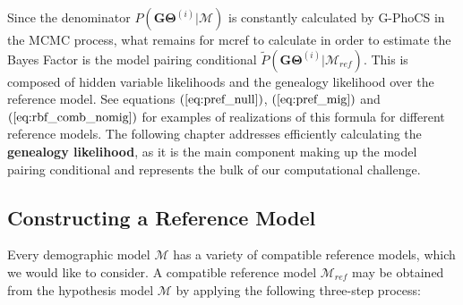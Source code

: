 \documentclass[11pt]{article}
\newcommand{\vect}[1]{\boldsymbol{\mathbf{#1}}}
\newcommand{\M}{\mathcal{M}}
\newcommand{\G}{\vect{G}}
\newcommand{\T}{\vect{\Theta}}
\newcommand{\GT}{\G\T}
\newcommand{\Mref}{\M_{ref}}
\newcommand{\Pref}{\widetilde{P}}
\newcommand{\1}{\mathbbm{1}}
\newcommand{\gp}{G-PhoCS }
\begin{document}
Since the denominator $P(\GT^{(i)}|\M)$ is constantly calculated by \gp in the MCMC process, what remains for mcref to calculate in order to estimate the Bayes Factor is the model pairing conditional $\Pref(\GT^{(i)}|\Mref)$. This is composed of hidden variable likelihoods and the genealogy likelihood over the reference model. See equations $(\ref{eq:pref_null})$, $(\ref{eq:pref_mig})$ and $(\ref{eq:rbf_comb_nomig})$ for examples of realizations of this formula for different reference models. The following chapter addresses efficiently calculating the \textbf{genealogy likelihood}, as it is the main component making up the model pairing conditional and represents the bulk of our computational challenge.\\

\subsection{Constructing a Reference Model}  \label{Constructing a Reference Model}


Every demographic model $\M$ has a variety of compatible reference models, which we would like to consider. A compatible reference model $\Mref$ may be obtained from the hypothesis model $\M$ by applying the following three-step process:
\end{document}
